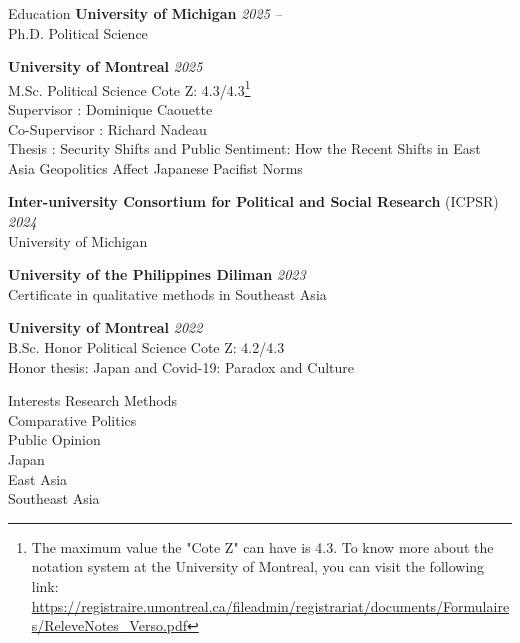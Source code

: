 \documentclass{resume} %
\begin{document}

\begin{rSection}{Education}
{\bf University of Michigan} \hfill {\em 2025 -- }
\\ Ph.D. Political Science

{\bf University of Montreal} \hfill {\em 2025} 
\\ M.Sc. Political Science \hfill {Cote Z: 4.3/4.3\footnote{The maximum value the "Cote Z" can have is 4.3. To know more about the notation system at the University of Montreal, you can visit the following link: \url{https://registraire.umontreal.ca/fileadmin/registrariat/documents/Formulaires/ReleveNotes_Verso.pdf}}}
\\ Supervisor : Dominique Caouette 
\\ Co-Supervisor : Richard Nadeau
\\ Thesis : Security Shifts and Public Sentiment: How the Recent Shifts in East Asia Geopolitics Affect Japanese Pacifist Norms

{\bf Inter-university Consortium for Political and Social Research} (ICPSR) \hfill {\em 2024} 
\\University of Michigan \hfill 

{\bf University of the Philippines Diliman} \hfill {\em 2023} 
\\ Certificate in qualitative methods in Southeast Asia\hfill 

{\bf University of Montreal} \hfill {\em 2022}
\\ B.Sc. Honor Political Science \hfill {Cote Z: 4.2/4.3}
\\ Honor thesis: Japan and Covid-19: Paradox and Culture

\end{rSection}


\begin{rSection}{Interests}
Research Methods
\\ Comparative Politics
\\ Public Opinion
\\ Japan
\\ East Asia
\\ Southeast Asia
\end{rSection}
\end{document}
